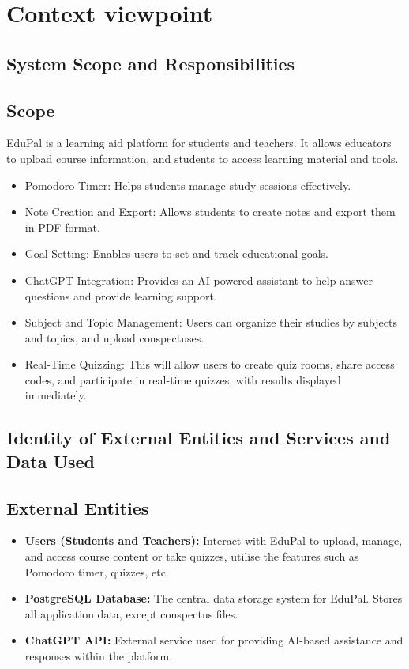 \section{Context viewpoint}


\subsection{System Scope and Responsibilities}

\subsection*{Scope}
EduPal is a learning aid platform for students and teachers. It allows educators to upload course information, and students to access learning material and tools.

\begin{itemize}
    \item Pomodoro Timer: Helps students manage study sessions effectively.
    \item Note Creation and Export: Allows students to create notes and export them in PDF format.
    \item Goal Setting: Enables users to set and track educational goals.
    \item ChatGPT Integration: Provides an AI-powered assistant to help answer questions and provide learning support.
    \item Subject and Topic Management: Users can organize their studies by subjects and topics, and upload conspectuses.
    \item Real-Time Quizzing: This will allow users to create quiz rooms, share access codes, and participate in real-time quizzes, with results displayed immediately.
\end{itemize}


\subsection{Identity of External Entities and Services and Data Used}

\subsection*{External Entities}
\begin{itemize}
    \item \textbf{Users (Students and Teachers):} Interact with EduPal to upload, manage, and access course content or take quizzes, utilise the features such as Pomodoro timer, quizzes, etc.
    \item \textbf{PostgreSQL Database:} The central data storage system for EduPal. Stores all application data, except conspectus files.
    \item \textbf{ChatGPT API:} External service used for providing AI-based assistance and responses within the platform.
\end{itemize}

